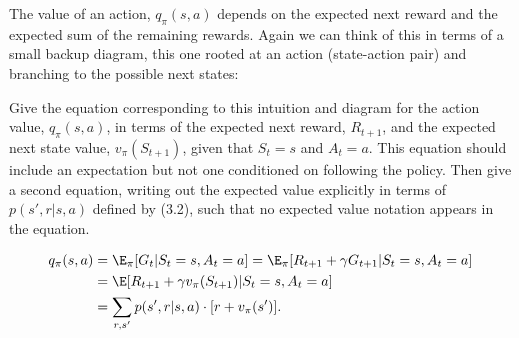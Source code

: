 
\begin{exercise}[Exercise 3.19]

The value of an action, $q_\pi(s,a)$ depends on the expected next reward and the
expected sum of the remaining rewards. Again we can think of this in terms of a
small backup diagram, this one rooted at an action (state-action pair) and branching
to the possible next states:


Give the equation corresponding to this intuition and diagram for the action value,
$q_\pi(s,a)$, in terms of the expected next reward, $R_{t+1}$, and the expected
next state value, $v_\pi(S_{t+1})$, given that $S_t = s$ and $A_t = a$.
This equation should include an expectation but not one conditioned on following
the policy. Then give a second equation, writing out the expected value explicitly
in terms of $p(s',r|s,a)$ defined by (3.2), such that no expected value notation
appears in the equation.

\end{exercise}


\begin{solution}

\begin{align*}
  q_\pi(s,a) &= \E_\pi[G_t | S_t = s, A_t = a] = \E_\pi[R_{t+1} + \gamma G_{t+1} | S_t = s, A_t = a] \\
  &= \E[R_{t+1} + \gamma v_\pi(S_{t+1}) | S_t = s, A_t = a] \\
  &= \sum_{r, s'} p(s',r|s,a)\cdot [r + v_\pi(s')]. \\
\end{align*}

\end{solution}

